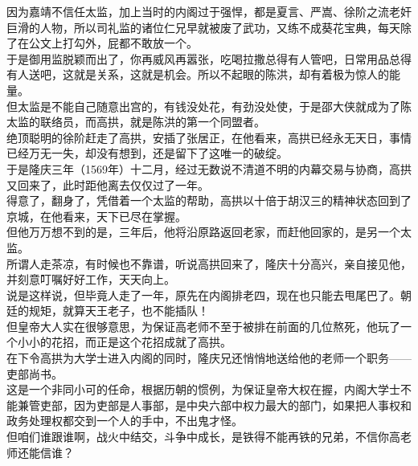 \begin{multicols}{\theparacolNo}
因为嘉靖不信任太监，加上当时的内阁过于强悍，都是夏言、严嵩、徐阶之流老奸巨滑的人物，所以司礼监的诸位仁兄早就被废了武功，又练不成葵花宝典，每天除了在公文上打勾外，屁都不敢放一个。\\

于是御用监脱颖而出了，你再威风再嚣张，吃喝拉撒总得有人管吧，日常用品总得有人送吧，这就是关系，这就是机会。所以不起眼的陈洪，却有着极为惊人的能量。\\

但太监是不能自己随意出宫的，有钱没处花，有劲没处使，于是邵大侠就成为了陈太监的联络员，而高拱，就是陈洪的第一个同盟者。\\

绝顶聪明的徐阶赶走了高拱，安插了张居正，在他看来，高拱已经永无天日，事情已经万无一失，却没有想到，还是留下了这唯一的破绽。\\

于是隆庆三年（1569年）十二月，经过无数说不清道不明的内幕交易与协商，高拱又回来了，此时距他离去仅仅过了一年。\\

得意了，翻身了，凭借着一个太监的帮助，高拱以十倍于胡汉三的精神状态回到了京城，在他看来，天下已尽在掌握。\\

但他万万想不到的是，三年后，他将沿原路返回老家，而赶他回家的，是另一个太监。\\

所谓人走茶凉，有时候也不靠谱，听说高拱回来了，隆庆十分高兴，亲自接见他，并刻意叮嘱好好工作，天天向上。\\

说是这样说，但毕竟人走了一年，原先在内阁排老四，现在也只能去甩尾巴了。朝廷的规矩，就算天王老子，也不能插队！\\

但皇帝大人实在很够意思，为保证高老师不至于被排在前面的几位熬死，他玩了一个小小的花招，而正是这个花招成就了高拱。\\

在下令高拱为大学士进入内阁的同时，隆庆兄还悄悄地送给他的老师一个职务——吏部尚书。\\

这是一个非同小可的任命，根据历朝的惯例，为保证皇帝大权在握，内阁大学士不能兼管吏部，因为吏部是人事部，是中央六部中权力最大的部门，如果把人事权和政务处理权都交到一个人的手中，不出鬼才怪。\\

但咱们谁跟谁啊，战火中结交，斗争中成长，是铁得不能再铁的兄弟，不信你高老师还能信谁？\\


\end{multicols}
